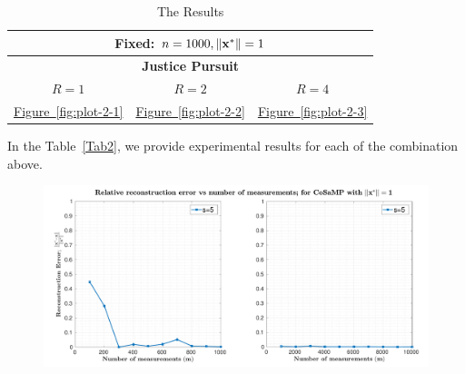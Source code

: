 \begin{center}
	\begin{table}
		\centering
		\begin{tabular}{ccc}\toprule
			\multicolumn{3}{c}{\small{\textbf{Fixed:} $n=1000,\|\mathbf{{x}^*}\|=1$}} \\ \midrule
			\multicolumn{3}{c}{\textbf{Justice Pursuit}}
			\\\cmidrule(r){1-3}%
			\small{$R =1$}&\small{$R=2$}&\small{$R=4$} \\\midrule
			\hyperref[fig:plot-2-1]{Figure~\ref{fig:plot-2-1}} & \hyperref[fig:plot-2-2]{Figure~\ref{fig:plot-2-2}}
			& \hyperref[fig:plot-2-3]{Figure~\ref{fig:plot-2-3}}   \\
			\bottomrule
		\end{tabular}
		\caption{The Results}\label{Tab3}
	\end{table} 	
\end{center}
In the Table~\ref{Tab2}, we provide experimental results for each of the combination above.

 
\begin{figure}[t]
	\begin{center}
		\includegraphics[width=\linewidth]{./fig/plot-1-1.pdf}
	\end{center}
	\caption{}
	\label{fig:plot-1-1}
\end{figure}

